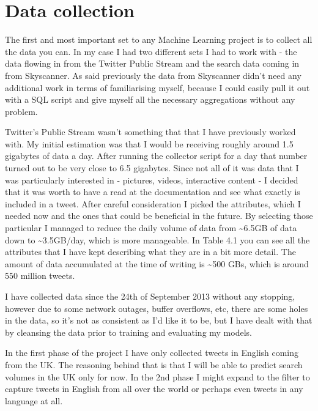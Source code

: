 \documentclass[minf,frontabs,twoside,singlespacing,parskip]{infthesis}
\begin{document}
\section{Data collection}
\label{sec:dc}


The first and most important set to any Machine Learning project is to collect all the data you can. In my case I had two different sets I had to work with - the data flowing in from the Twitter Public Stream and the search data coming in from Skyscanner. As said previously the data from Skyscanner didn't need any additional work in terms of familiarising myself, because I could easily pull it out with a SQL script and give myself all the necessary aggregations without any problem. 


Twitter's Public Stream wasn't something that that I have previously worked with. My initial estimation was that I would be receiving roughly around 1.5 gigabytes of data a day. After running the collector script for a day that number turned out to be very close to 6.5 gigabytes. Since not all of it was data that I was particularly interested in - pictures, videos, interactive content - I decided that it was worth to have a read at the documentation and see what exactly is included in a tweet. \cite{tweetobject} After careful consideration I picked the attributes, which I needed now and the ones that could be beneficial in the future. By selecting those particular I managed to reduce the daily volume of data from \textasciitilde 6.5GB of data down to \textasciitilde 3.5GB/day, which is more manageable. In Table 4.1 you can see all the attributes that I have kept describing what they are in a bit more detail. The amount of data accumulated at the time of writing is \textasciitilde 500 GBs, which is around 550 million tweets. 


I have collected data since the 24th of September 2013 without any stopping, however due to some network outages, buffer overflows, etc, there are some holes in the data, so it's not as consistent as I'd like it to be, but I have dealt with that by cleansing the data prior to training and evaluating my models. 


In the first phase of the project I have only collected tweets in English coming from the UK. The reasoning behind that is that I will be able to predict search volumes in the UK only for now. In the 2nd phase I might expand to the filter to capture tweets in English from all over the world or perhaps even tweets in any language at all. 

\end{document}
